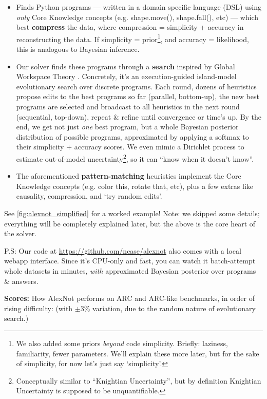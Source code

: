 \documentclass[11pt]{article}
\begin{document}
\begin{itemize}
    \item Finds Python programs — written in a domain specific language (DSL) using \textit{only} Core Knowledge concepts (e.g. shape.move(), shape.fall(), etc) — which best \textbf{compress} the data, where compression = simplicity + accuracy in reconstructing the data. If simplicity = prior\footnote{We also added some priors \textit{beyond} code simplicity. Briefly: laziness, familiarity, fewer parameters. We'll explain these more later, but for the sake of simplicity, for now let's just say `simplicity'.}, and accuracy = likelihood, this is analogous to Bayesian inference.
    \item  Our solver finds these programs through a \textbf{search} inspired by Global Workspace Theory \citep{baars_gwt}. Concretely, it's an execution-guided \citep{execution_guided} island-model \citep{island_model} evolutionary search over discrete programs. Each round, dozens of heuristics propose edits to the best programs so far (parallel, bottom-up), the new best programs are selected and broadcast to all heuristics in the next round (sequential, top-down), repeat \& refine until convergence or time's up. By the end, we get not just \textit{one} best program, but a whole Bayesian posterior distribution of possible programs, approximated by applying a softmax to their simplicity + accuracy scores. We even mimic a Dirichlet process \citep{dirichlet_process} to estimate out-of-model uncertainty\footnote{Conceptually similar to ``Knightian Uncertainty'', but by definition Knightian Uncertainty is supposed to be unquantifiable.}, so it can ``know when it doesn't know''.
    \item The aforementioned \textbf{pattern-matching} heuristics implement the Core Knowledge concepts (e.g. color this, rotate that, etc), plus a few extras like causality, compression, and `try random edits'.
\end{itemize}

See \autoref{fig:alexnot_simplified} for a worked example! Note: we skipped some details; everything will be completely explained later, but the above is the core heart of the solver.

P.S: Our code at \url{https://github.com/ncase/alexnot} also comes with a local webapp interface. Since it's CPU-only and fast, you can watch it batch-attempt whole datasets in minutes, \textit{with} approximated Bayesian posterior over programs \& answers.

\textbf{Scores:} How AlexNot performs on ARC and ARC-like benchmarks, in order of rising difficulty: (with $\pm$3\% variation, due to the random nature of evolutionary search.)
\end{document}
